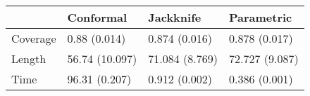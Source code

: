 \begin{tabular}{|l|l|l|l|}
\hline
& Conformal & Jackknife & Parametric \\
\hline
Coverage & 0.88 (0.014) & 0.874 (0.016) & 0.878 (0.017) \\
\hline
Length & 56.74 (10.097) & 71.084 (8.769) & 72.727 (9.087) \\
\hline
Time & 96.31 (0.207) & 0.912 (0.002) & 0.386 (0.001) \\
\hline
\end{tabular}

